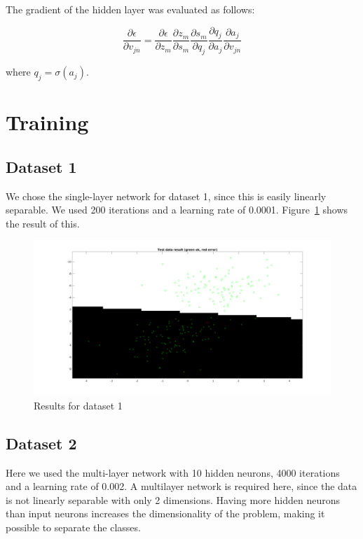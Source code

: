 \documentclass{article}
\begin{document}
The gradient of the hidden layer was evaluated as follows:

\begin{equation}
  \frac{\partial \epsilon}{\partial v_{jn}} =
  \frac{\partial \epsilon}{\partial z_m}
  \frac{\partial z_m}{\partial s_m}
  \frac{\partial s_m}{\partial q_j}
  \frac{\partial q_j}{\partial a_j}
  \frac{\partial a_j}{\partial v_{jn}}
\end{equation}

where $q_j = \sigma(a_j)$.

\section{Training}

\subsection{Dataset 1}

We chose the single-layer network for dataset 1, since this 
is easily linearly separable. We used 200 iterations and a learning rate of
0.0001. Figure~\ref{fig:res1} shows the result of this.

\begin{figure}
    \label{fig:res1}
    \includegraphics[width=13cm]{dataset1res.png}
    \caption{Results for dataset 1}
\end{figure}

\subsection{Dataset 2}

Here we used the multi-layer network with 10 hidden neurons, 4000 iterations and a
learning rate of 0.002. A multilayer network is required here, since the data
is not linearly separable with only 2 dimensions. Having more hidden neurons
than input neurons increases the dimensionality of the problem, making it
possible to separate the classes.
\end{document}

